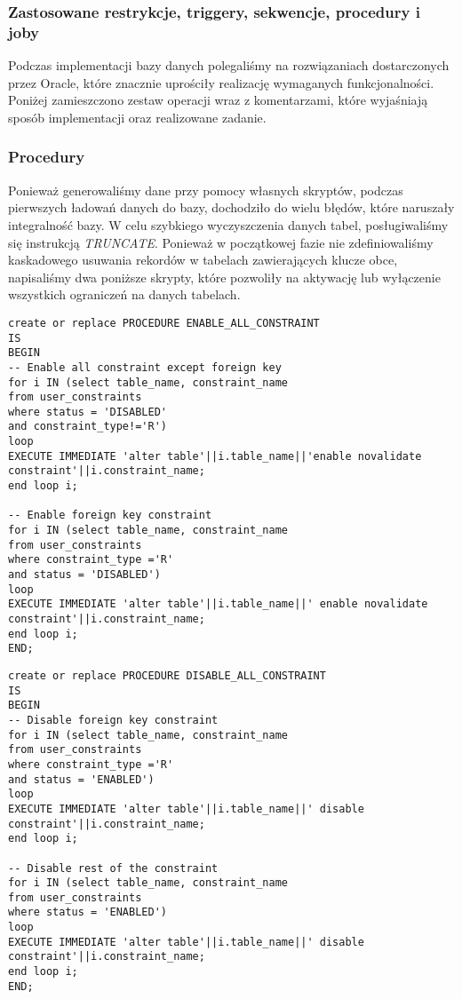 \documentclass[a4paper]{article}
\begin{document}
\subsubsection{Zastosowane restrykcje, triggery, sekwencje, procedury i joby}

Podczas implementacji bazy danych polegaliśmy na rozwiązaniach dostarczonych przez Oracle, które znacznie uprościły realizację wymaganych funkcjonalności. Poniżej zamieszczono zestaw operacji wraz z komentarzami, które wyjaśniają sposób implementacji oraz realizowane zadanie.

\subsubsection{Procedury}

Ponieważ generowaliśmy dane przy pomocy własnych skryptów, podczas pierwszych ładowań danych do bazy, dochodziło do wielu błędów, które naruszały integralność bazy. W celu szybkiego wyczyszczenia danych tabel, posługiwaliśmy się instrukcją \textit{TRUNCATE}. Ponieważ w początkowej fazie nie zdefiniowaliśmy kaskadowego usuwania rekordów w tabelach zawierających klucze obce, napisaliśmy dwa poniższe skrypty, które pozwoliły na aktywację lub wyłączenie wszystkich ograniczeń na danych tabelach.

\begin{verbatim}
create or replace PROCEDURE ENABLE_ALL_CONSTRAINT
IS
BEGIN
-- Enable all constraint except foreign key
for i IN (select table_name, constraint_name
from user_constraints
where status = 'DISABLED'
and constraint_type!='R')
loop
EXECUTE IMMEDIATE 'alter table'||i.table_name||'enable novalidate constraint'||i.constraint_name;
end loop i;

-- Enable foreign key constraint
for i IN (select table_name, constraint_name
from user_constraints
where constraint_type ='R'
and status = 'DISABLED')
loop
EXECUTE IMMEDIATE 'alter table'||i.table_name||' enable novalidate constraint'||i.constraint_name;
end loop i;
END;

\end{verbatim}

\begin{verbatim}
create or replace PROCEDURE DISABLE_ALL_CONSTRAINT
IS
BEGIN
-- Disable foreign key constraint
for i IN (select table_name, constraint_name
from user_constraints
where constraint_type ='R'
and status = 'ENABLED')
loop
EXECUTE IMMEDIATE 'alter table'||i.table_name||' disable constraint'||i.constraint_name;
end loop i;

-- Disable rest of the constraint
for i IN (select table_name, constraint_name
from user_constraints
where status = 'ENABLED')
loop
EXECUTE IMMEDIATE 'alter table'||i.table_name||' disable constraint'||i.constraint_name;
end loop i;
END;

\end{verbatim}
\end{document}
